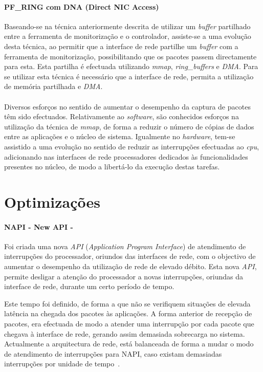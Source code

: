 \paragraph*{PF\_RING com DNA (Direct NIC Access)}
Baseando-se na técnica anteriormente descrita de utilizar um \textit{buffer} partilhado entre a ferramenta de monitorização e o controlador, assiste-se a uma evolução desta técnica, ao permitir que a interface de rede partilhe um \textit{buffer} com a ferramenta de monitorização, possibilitando que os pacotes passem directamente para esta\cite{IntroPF_RIDNADirecNICAcces}.
Esta partilha é efectuada utilizando \textit{mmap}, \textit{ring\_buffers} e \textit{DMA}.
Para se utilizar esta técnica é necessário que a interface de rede, permita a utilização de memória partilhada e \textit{DMA}.

\paragraph*{}

Diversos esforços no sentido de aumentar o desempenho da captura de pacotes têm sido efectuados.
Relativamente ao \textit{software}, são conhecidos esforços na utilização da técnica de \textit{mmap}, de forma a reduzir o número de cópias de dados entre as aplicações e o núcleo de sistema.
Igualmente no \textit{hardware}, tem-se assistido a uma evolução no sentido de reduzir as interrupções efectuadas ao \textit{cpu}, adicionando nas interfaces de rede processadores dedicados às funcionalidades presentes no núcleo, de modo a libertá-lo da execução destas tarefas.


\section{Optimizações}

\paragraph*{NAPI - New API - }

Foi criada uma nova \textit{API} (\textit{Application Program Interface}) de atendimento de interrupções do processador, oriundos das interfaces de rede, com o objectivo de aumentar o desempenho da utilização de rede de elevado débito.
Esta nova \textit{API}, permite desligar a atenção do processador a novas interrupções, oriundas da interface de rede, durante um certo período de tempo.

Este tempo foi definido, de forma a que não se verifiquem situações de elevada latência na chegada dos pacotes às aplicações.
A forma anterior de recepção de pacotes, era efectuada de modo a atender uma interrupção por cada pacote que chegava à interface de rede, gerando assim demasiada sobrecarga no sistema.
Actualmente a arquitectura de rede, está balanceada de forma a mudar o modo de atendimento de interrupções para NAPI, caso existam demasiadas interrupções por unidade de tempo~\cite{administrator:napi}.

